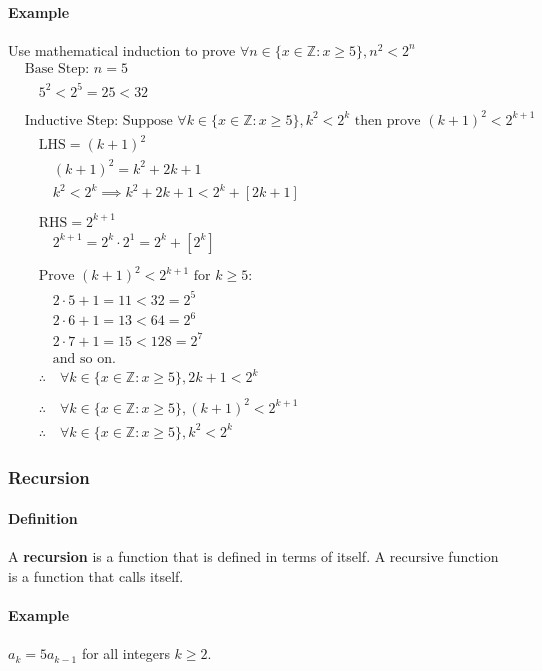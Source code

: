 \paragraph*{Example}
Use mathematical induction to prove \newline $\forall n \in \{x \in \mathbb{Z} : x \geq 5\}, n^2 < 2^n$
\begin{align*}
    &\text{Base Step: } n = 5\\
    &\quad 5^2 < 2^5 = 25 < 32\\
    \\
    &\text{Inductive Step:} \text{ Suppose } \forall k \in \{x \in \mathbb{Z} : x \geq 5\}, k^2 < 2^k \text{ then prove } (k+1)^2 < 2^{k+1}\\
    &\quad \text{LHS} = (k+1)^2\\
    &\qquad (k+1)^2 = k^2 + 2k + 1\\
    &\qquad k^2 < 2^k \implies k^2 + 2k + 1 < 2^k + [2k + 1]\\
    \\
    &\quad \text{RHS} = 2^{k+1}\\
    &\qquad 2^{k+1} = 2^k \cdot 2^1 = 2^k + [2^k]\\
    \\
    &\quad \text{Prove } (k+1)^2 < 2^{k+1} \text{ for } k \geq 5:\\
    &\qquad 2 \cdot 5 + 1 = 11 < 32 = 2^5\\
    &\qquad 2 \cdot 6 + 1 = 13 < 64 = 2^6\\
    &\qquad 2 \cdot 7 + 1 = 15 < 128 = 2^7\\
    &\qquad \text{and so on.}\\
    &\quad \therefore \quad \forall k \in \{x \in \mathbb{Z} : x \geq 5\}, 2k+1 < 2^k\\
    \\
    &\quad \therefore \quad \forall k \in \{x \in \mathbb{Z} : x \geq 5\}, (k+1)^2 < 2^{k+1}\\
    &\quad \therefore \quad \forall k \in \{x \in \mathbb{Z} : x \geq 5\}, k^2 < 2^k
\end{align*}

\subsubsection*{Recursion}
\paragraph*{Definition}
A \textbf{recursion} is a function that is defined in terms of itself. A recursive function is a function that calls itself.
\paragraph*{Example}
$a_k = 5a_{k-1}$ for all integers $k \geq 2$.
